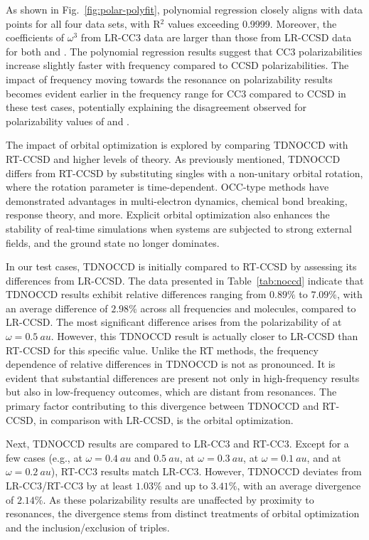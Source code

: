 As shown in Fig.~\ref{fig:polar-polyfit}, polynomial regression closely aligns with data points for all four data sets, with R$^{2}$ values exceeding 0.9999. Moreover, the coefficients of $\omega^{3}$ from LR-CC3 data are larger than those from LR-CCSD data for both  and . The polynomial regression results suggest that CC3 polarizabilities increase slightly faster with frequency compared to CCSD polarizabilities. The impact of frequency moving towards the resonance on polarizability results becomes evident earlier in the frequency range for CC3 compared to CCSD in these test cases, potentially explaining the disagreement observed for polarizability values of  and .

The impact of orbital optimization is explored by comparing TDNOCCD with RT-CCSD and higher levels of theory. As previously mentioned, TDNOCCD differs from RT-CCSD by substituting singles with a non-unitary orbital rotation, where the rotation parameter is time-dependent. OCC-type methods have demonstrated advantages in multi-electron dynamics, chemical bond breaking, response theory, and more.\cite{Pedersen2001, Kohn2005, Sato2018, Pathak2022} Explicit orbital optimization also enhances the stability of real-time simulations when systems are subjected to strong external fields, and the ground state no longer dominates.\cite{Kristiansen2020}

In our test cases, TDNOCCD is initially compared to RT-CCSD by assessing its differences from LR-CCSD. The data presented in Table~\ref{tab:noccd} indicate that TDNOCCD results exhibit relative differences ranging from $0.89\%$ to $7.09\%$, with an average difference of $2.98\%$ across all frequencies and molecules, compared to LR-CCSD. The most significant difference arises from the polarizability of  at $\omega=0.5\ au$. However, this TDNOCCD result is actually closer to LR-CCSD than RT-CCSD for this specific value. Unlike the RT methods, the frequency dependence of relative differences in TDNOCCD is not as pronounced. It is evident that substantial differences are present not only in high-frequency results but also in low-frequency outcomes, which are distant from resonances. The primary factor contributing to this divergence between TDNOCCD and RT-CCSD, in comparison with LR-CCSD, is the orbital optimization.

Next, TDNOCCD results are compared to LR-CC3 and RT-CC3. Except for a few cases (e.g.,  at $\omega=0.4\ au$ and $0.5\ au$,  at $\omega=0.3\ au$,  at $\omega=0.1\ au$, and  at $\omega=0.2\ au$), RT-CC3 results match LR-CC3. However, TDNOCCD deviates from LR-CC3/RT-CC3 by at least $1.03\%$ and up to $3.41\%$, with an average divergence of $2.14\%$. As these polarizability results are unaffected by proximity to resonances, the divergence stems from distinct treatments of orbital optimization and the inclusion/exclusion of triples.

